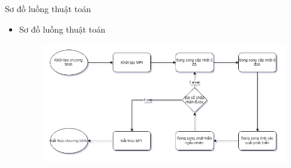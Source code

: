 \begin{frame}{Sơ đồ luồng thuật toán}
\begin{itemize}
	\item Sơ đồ luồng thuật toán
    \begin{figure}[H]
        \centering
        \includegraphics[width=110mm]{img/algo-flowchart.png}
    \end{figure}
\end{itemize}
\end{frame}